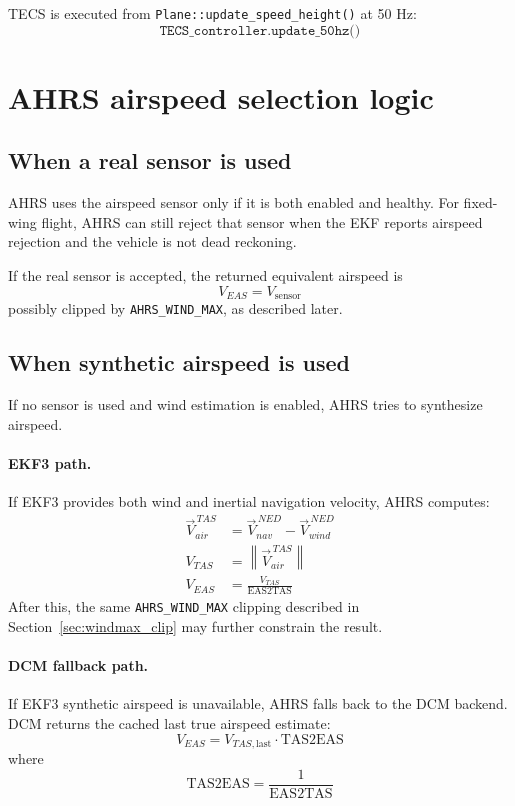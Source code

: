 \documentclass[11pt]{article}
\begin{document}
TECS is executed from \texttt{Plane::update\_speed\_height()} at 50 Hz:
\begin{equation}
\texttt{TECS\_controller.update\_50hz()}
\end{equation}

\section{AHRS airspeed selection logic}

\subsection{When a real sensor is used}

AHRS uses the airspeed sensor only if it is both enabled and healthy. For fixed-wing flight, AHRS can still reject that sensor when the EKF reports airspeed rejection and the vehicle is not dead reckoning.

If the real sensor is accepted, the returned equivalent airspeed is
\begin{equation}
V_{EAS} = V_{\text{sensor}}
\end{equation}
possibly clipped by \texttt{AHRS\_WIND\_MAX}, as described later.

\subsection{When synthetic airspeed is used}

If no sensor is used and wind estimation is enabled, AHRS tries to synthesize airspeed.

\paragraph{EKF3 path.}
If EKF3 provides both wind and inertial navigation velocity, AHRS computes:
\begin{align}
\vec{V}_{air}^{\,TAS} &= \vec{V}_{nav}^{\,NED} - \vec{V}_{wind}^{\,NED} \\
V_{TAS} &= \left\lVert \vec{V}_{air}^{\,TAS} \right\rVert \\
V_{EAS} &= \frac{V_{TAS}}{\text{EAS2TAS}}
\end{align}
After this, the same \texttt{AHRS\_WIND\_MAX} clipping described in Section~\ref{sec:windmax_clip} may further constrain the result.

\paragraph{DCM fallback path.}
If EKF3 synthetic airspeed is unavailable, AHRS falls back to the DCM backend. DCM returns the cached last true airspeed estimate:
\begin{equation}
V_{EAS} = V_{TAS,\text{last}} \cdot \text{TAS2EAS}
\end{equation}
where
\begin{equation}
\text{TAS2EAS} = \frac{1}{\text{EAS2TAS}}
\end{equation}
\end{document}
